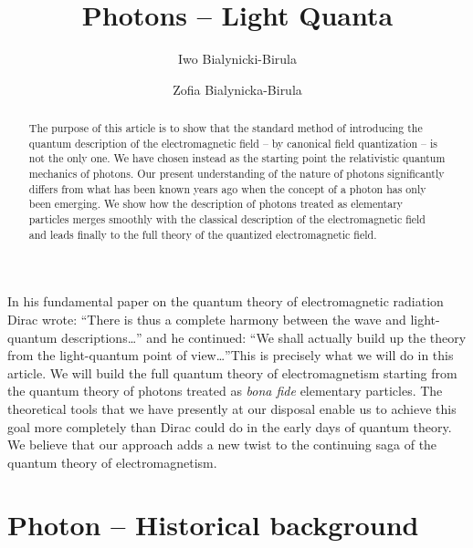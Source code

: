\documentclass[onecolumn,aps,pra,12pt]{revtex4-1}
\begin{document}
\title{Photons -- Light Quanta}
\author{Iwo Bialynicki-Birula}
\author{Zofia Bialynicka-Birula}

\begin{abstract}
The purpose of this article is to show that the standard method of introducing the quantum description of the electromagnetic field -- by canonical field quantization -- is not the only one. We have chosen instead as the starting point the relativistic quantum mechanics of photons. Our present understanding of the nature of photons significantly differs from what has been known years ago when the concept of a photon has only been emerging. We show how the description of photons treated as elementary particles merges smoothly with the classical description of the electromagnetic field and leads finally to the full theory of the quantized electromagnetic field.
\end{abstract}

\maketitle

\pagestyle{plain}

In his fundamental paper \cite{pamd} on the quantum theory of electromagnetic radiation Dirac wrote:
``There is thus a complete harmony between the wave and light-quantum descriptions\dots'' and he continued:
``We shall actually build up the theory from the light-quantum point of view\dots''This is precisely what we will do in this article. We will build the full quantum theory of electromagnetism starting from the quantum theory of photons treated as {\em bona fide} elementary particles. The theoretical tools that we have presently at our disposal enable us to achieve this goal more completely than Dirac could do in the early days of quantum theory. We believe that our approach adds a new twist to the continuing saga of the quantum theory of electromagnetism.

\section{Photon -- Historical background}
\end{document}
